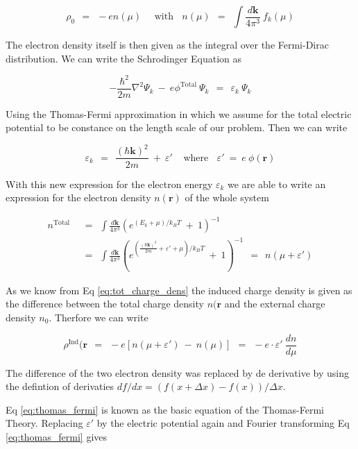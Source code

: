 \documentclass[10pt]{report}
\numberwithin{equation}{chapter}
\newcommand{\refEq}[1]{
  Eq  \ref{#1}
}
\begin{document}
\begin{equation}
  \rho_0 ~~=~~ -e n(\mu) ~~~~~~\text{with}~~~~ 
  n(\mu) ~~=~~ \int \frac{d \mathbf{k}}{4\pi^3}\ f_k(\mu)
\end{equation}

The electron density itself is then given as the integral over the Fermi-Dirac distribution. We can write the Schrodinger Equation as 

\begin{equation}
  -\frac{\hbar^2}{2m} \nabla^2 \Psi_k ~-~ e\phi^\text{Total}\ \Psi_k ~~=~~ \varepsilon_k\ \Psi_k
\end{equation}

Using the Thomas-Fermi approximation in which we assume for the total electric potential to be constance on the length scale of our problem. Then we can write

\begin{equation}
  \varepsilon_k ~~=~~ \frac{(\hbar \mathbf{k})^2}{2m} ~+~ \varepsilon' ~~~~~\text{where}~~~~
  \varepsilon' ~=~ e\ \phi(\mathbf{r})
\end{equation}

With this new expression for the electron energy $\varepsilon_k$ we are able to write an expression for the electron density $n(\mathbf{r})$ of the whole system

\begin{align}
  n^\text{Total} ~~& =~~ \int \frac{d \mathbf{k}}{4\pi^3} \left(e^{(E_k + \mu)/k_BT} ~+~ 1 \right)^{-1} \nonumber \\
  ~~& =~~ \int \frac{d \mathbf{k}}{4\pi^3} \left(e^{(\frac{(\hbar \mathbf{k})^2}{2m} + \varepsilon' + \mu)/k_BT} ~+~ 1 \right)^{-1} 
  ~~=~~ n(\mu + \varepsilon')
\end{align}


As we know from \refEq{eq:tot_charge_dens} the induced charge density is given as the difference between the total charge density $n(\mathbf{r}$ and the external charge density $n_0$. Therfore we can write

\begin{equation} \label{eq:thomas_fermi}
  \rho^\text{Ind}(\mathbf{r} ~~=~~ -e \left[ n(\mu + \varepsilon') ~-~ n(\mu) \right] 
  ~~=~~ -e \cdot \varepsilon'\ \frac{dn}{d\mu}
\end{equation}

The difference of the two electron density was replaced by de derivative by using the defintion of derivaties $df/dx = (f(x+\Delta x) - f(x))/\Delta x$.
\refEq{eq:thomas_fermi} is known as the basic equation of the Thomas-Fermi Theory. Replacing $\varepsilon'$ by the electric potential again and Fourier transforming \refEq{eq:thomas_fermi} gives
\end{document}
